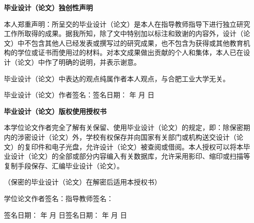\begin{titlepage}
    \linespread{1.5}\selectfont

    \begin{center}
        \heiti \Large
        \bfseries{毕业设计（论文）独创性声明}\vspace{0.5cm}
    \end{center}

    本人郑重声明：所呈交的毕业设计（论文）是本人在指导教师指导下进行独立研究工作所取得的成果。据我所知，除了文中特别加以标注和致谢的内容外，设计（论文）中不包含其他人已经发表或撰写过的研究成果，也不包含为获得或其他教育机构的学位或证书而使用过的材料。对本文成果做出贡献的个人和集体，本人已在设计（论文）中作了明确的说明，并表示谢意。

    毕业设计（论文）中表达的观点纯属作者本人观点，与合肥工业大学无关。

    毕业设计（论文）作者签名：\hfill 签名日期：\makebox[2em][c]{\signYear} 年 \makebox[1.5em][c]{\signMonth} 月 \makebox[1.5em][c]{\signDay} 日

    \vspace{2cm}
    \begin{center}
        \heiti \Large
        \bfseries{毕业设计（论文）版权使用授权书}\vspace{0.7cm}
    \end{center}

    本学位论文作者完全了解有关保留、使用毕业设计（论文）的规定，即：除保密期内的涉密设计（论文）外，学校有权保存并向国家有关部门或机构送交设计（论文）的复印件和电子光盘，允许设计（论文）被查阅或借阅。本人授权可以将本毕业设计（论文）的全部或部分内容编入有关数据库，允许采用影印、缩印或扫描等复制手段保存、汇编毕业设计（论文）。

    （保密的毕业设计（论文）在解密后适用本授权书） \vspace{1.2cm}

    学位论文作者签名：\hfill 指导教师签名：\hspace{7em}

    签名日期：\makebox[2em][c]{\signYear} 年 \makebox[1.5em][c]{\signMonth} 月 \makebox[1.5em][c]{\signDay} 日\hfill 签名日期：\makebox[2em][c]{\signYear} 年 \makebox[1.5em][c]{\signMonth} 月 \makebox[1.5em][c]{\signDay} 日


\end{titlepage}